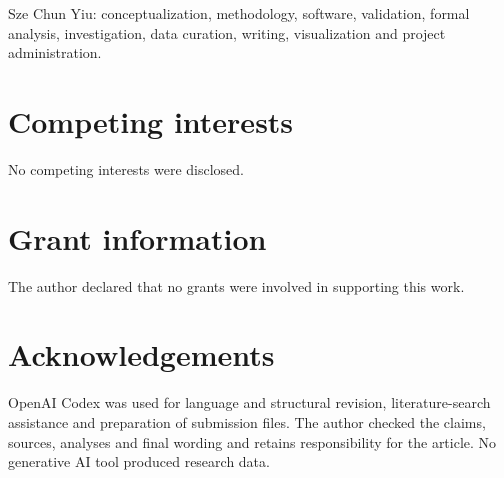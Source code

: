 Sze Chun Yiu: conceptualization, methodology, software, validation, formal
analysis, investigation, data curation, writing, visualization and project
administration.

\section*{Competing interests}

No competing interests were disclosed.

\section*{Grant information}

The author declared that no grants were involved in supporting this work.

\section*{Acknowledgements}

OpenAI Codex was used for language and structural revision,
literature-search assistance and preparation of submission files. The author
checked the claims, sources, analyses and final wording and retains
responsibility for the article. No generative AI tool produced research data.



